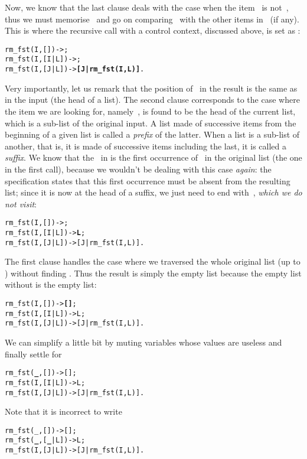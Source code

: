 Now, we know that the last clause deals with the case when the item
~is not~, thus we must memorise~ and
go on comparing~ with the other items in~ (if
any). This is where the recursive call with a control context,
discussed above, is set as \erlcode{[J|\textvisiblespace]}:
\begin{alltt}
rm_fst(I,   []) -> \fbcode{[J|rm_fst(I,L)]};
rm_fst(I,[I|L]) -> \fbcode{[J|rm_fst(I,L)]};
rm_fst(I,[J|L]) -> \textbf{[J|rm_fst(I,L)]}.
\end{alltt}
Very importantly, let us remark that the position of~ in
the result is the same as in the input (the head of a list). The
second clause corresponds to the case where the item we are looking
for, namely~, is found to be the head of the current list,
which is a sub\hyp{}list of the original input. A list made of
successive items from the beginning of a given list is called a
\emph{prefix} of the latter. When a list is a sub\hyp{}list of
another, that is, it is made of successive items including the last,
it is called a \emph{suffix}. We know that the~ in
\erlcode{[I|L]} is the first occurrence of~ in the original
list (the one in the first call), because we wouldn't be dealing with
this case \emph{again}: the specification states that this first
occurrence must be absent from the resulting list; since it is now at
the head of a suffix, we just need to end with~,
\emph{which we do not visit}:
\begin{alltt}
rm_fst(I,   []) -> \fbcode{[J|rm_fst(I,L)]};
rm_fst(I,[I|L]) -> \textbf{L};
rm_fst(I,[J|L]) -> [J|rm_fst(I,L)].
\end{alltt}
The first clause handles the case where we traversed the whole
original list (up to \erlcode{[]}) without finding . Thus
the result is simply the empty list because the empty list without
 is the empty list:
\begin{alltt}
rm_fst(I,   []) -> \textbf{[]};
rm_fst(I,[I|L]) -> L;
rm_fst(I,[J|L]) -> [J|rm_fst(I,L)].
\end{alltt}
We can simplify a little bit by muting variables whose values are
useless and finally settle for\label{code:rm_fst}
\begin{alltt}
rm_fst(\textbf{\_},   []) -> [];\hfill% \emph{Here}
rm_fst(I,[I|L]) -> L;
rm_fst(I,[J|L]) -> [J|rm_fst(I,L)].
\end{alltt}
Note that it is incorrect to write
\begin{alltt}
rm_fst(_,   []) -> [];
rm_fst(\textbf{\_},[\textbf{\_}|L]) -> L;\hfill% \emph{Error}
rm_fst(I,[J|L]) -> [J|rm_fst(I,L)].\hfill% \emph{Becomes useless}
\end{alltt}
